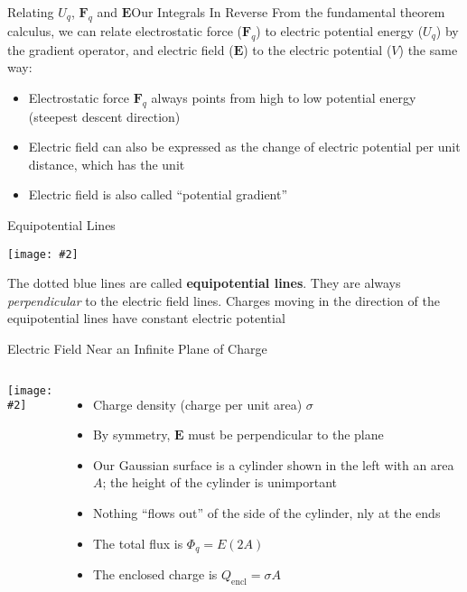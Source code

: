 \documentclass[12pt,aspectratio=169]{beamer}
\newcommand{\pic}[2]{\texttt{[image: \#2]}}
\newcommand{\mb}[1]{\mathbf{#1}}
\newcommand{\eq}[2]{\vspace{#1}{\Large\begin{displaymath}#2\end{displaymath}}}
\begin{document}
\begin{frame}{Relating $U_q$, $\mb{F}_q$ and $\mb{E}$}{Our Integrals In Reverse}
  From the fundamental theorem calculus, we can relate electrostatic force
  ($\mb{F}_q$) to electric potential energy ($U_q$) by the gradient operator,
  and electric field ($\mb{E}$) to the electric potential ($V$) the same way:

  \eq{-.2in}{
    \mb{F}_q=-\nabla U_q=-\frac{\partial U_q}{\partial r}\hat{\mb{r}}
    \quad\;\;
    \mb{E}=-\nabla V=-\frac{\partial V}{\partial r}\hat{\mb{r}}
  }
  \begin{itemize}  
  \item Electrostatic force $\mb{F}_q$ always points from high to
    low potential energy (steepest descent direction)
  \item Electric field can also be expressed as the change of electric
    potential per unit distance, which has the unit
    
    \eq{-.2in}{
      \SI{1}{\newton\per\coulomb}=\SI{1}{\volt\per\metre}
    }
  \item Electric field is also called ``potential gradient''
  \end{itemize}
\end{frame}



\begin{frame}{Equipotential Lines}
  \begin{center}
    \pic{0.65}{plate3.png}
  \end{center}
  The dotted blue lines are called \textbf{equipotential lines}. They are
  always \emph{perpendicular} to the electric field lines. Charges moving in
  the direction of the equipotential lines have constant electric potential
\end{frame}



\begin{frame}{Electric Field Near an Infinite Plane of Charge}
  \begin{columns}
    \pic{1.1}{elec_gauss_figure9.png}

    \begin{itemize}
    \item Charge density (charge per unit area) $\sigma$
    \item By symmetry, $\mb{E}$ must be perpendicular to the plane
    \item Our Gaussian surface is a cylinder shown in the left with an area
      $A$; the height of the cylinder is unimportant
    \item Nothing ``flows out'' of the side of the cylinder, nly at the ends
    \item The total flux is $\Phi_q=E(2A)$
    \item The enclosed charge is $Q_\mathrm{encl}=\sigma A$
    \end{itemize}
  \end{columns}
\end{frame}
\end{document}
